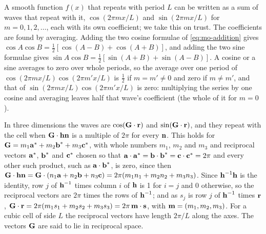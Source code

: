\begin{toolbox}
A smooth function $f(x)$ that repeats with period $L$ can be written as a
sum of waves that repeat with it, $\cos(2\pi mx/L)$ and $\sin(2\pi mx/L)$
for $m = 0, 1, 2, \dots$, each with its own coefficient; we take this on
trust. The coefficients are found by averaging. Adding the two cosine
formulae of \cref{eq:mo-addition} gives $\cos A\cos B = \frac12[\cos(A -
B) + \cos(A + B)]$, and adding the two sine formulae gives $\sin A\cos B =
\frac12[\sin(A + B) + \sin(A - B)]$. A cosine or a sine averages to zero
over whole periods, so the average over one period of $\cos(2\pi mx/L)
\cos(2\pi m'x/L)$ is $\frac12$ if $m = m' \neq 0$ and zero if $m \neq m'$,
and that of $\sin(2\pi mx/L)\cos(2\pi m'x/L)$ is zero: multiplying the
series by one cosine and averaging leaves half that wave's coefficient
(the whole of it for $m = 0$).

In three dimensions the waves are $\cos(\bm{\mathrm{G}}\cdot\bm{\mathrm{r}})$ and
$\sin(\bm{\mathrm{G}}\cdot\bm{\mathrm{r}})$, and they repeat with the cell when
$\bm{\mathrm{G}}\cdot\bm{\mathrm{h}}\bm{\mathrm{n}}$ is a multiple of $2\pi$ for every $\bm{\mathrm{n}}$. This
holds for $\bm{\mathrm{G}} = m_1\bm{\mathrm{a}}^* + m_2\bm{\mathrm{b}}^* + m_3\bm{\mathrm{c}}^*$, with whole
numbers $m_1$, $m_2$ and $m_3$ and reciprocal vectors $\bm{\mathrm{a}}^*$,
$\bm{\mathrm{b}}^*$ and $\bm{\mathrm{c}}^*$ chosen so that $\bm{\mathrm{a}}\cdot\bm{\mathrm{a}}^* =
\bm{\mathrm{b}}\cdot\bm{\mathrm{b}}^* = \bm{\mathrm{c}}\cdot\bm{\mathrm{c}}^* = 2\pi$ and every other such
product, such as $\bm{\mathrm{a}}\cdot\bm{\mathrm{b}}^*$, is zero, since then
$\bm{\mathrm{G}}\cdot\bm{\mathrm{h}}\bm{\mathrm{n}} = \bm{\mathrm{G}}\cdot(n_1\bm{\mathrm{a}} + n_2\bm{\mathrm{b}} + n_3\bm{\mathrm{c}})
= 2\pi(m_1n_1 + m_2n_2 + m_3n_3)$. Since $\bm{\mathrm{h}}^{-1}\bm{\mathrm{h}}$ is the
identity, row $j$ of $\bm{\mathrm{h}}^{-1}$ times column $i$ of $\bm{\mathrm{h}}$ is 1 for
$i = j$ and 0 otherwise, so the reciprocal vectors are $2\pi$ times the
rows of $\bm{\mathrm{h}}^{-1}$; and as $s_j$ is row $j$ of $\bm{\mathrm{h}}^{-1}$ times
$\bm{\mathrm{r}}$, $\bm{\mathrm{G}}\cdot\bm{\mathrm{r}} = 2\pi(m_1s_1 + m_2s_2 + m_3s_3) =
2\pi\,\bm{\mathrm{m}}\cdot\bm{\mathrm{s}}$, with $\bm{\mathrm{m}} = (m_1, m_2, m_3)$. For a cubic
cell of side $L$ the reciprocal vectors have length $2\pi/L$ along the
axes. The vectors $\bm{\mathrm{G}}$ are said to lie in reciprocal space.


\end{toolbox}
